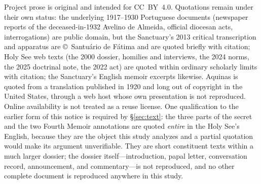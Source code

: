 Project prose is original and intended for CC~BY~4.0. Quotations
remain under their own status: the underlying 1917--1930 Portuguese
documents (newspaper reports of the deceased-in-1932 Avelino de
Almeida, official diocesan acts, interrogations) are public domain,
but the Sanctuary's 2013 critical transcription and apparatus are
\copyright~Santu\'ario de F\'atima and are quoted briefly with
citation; Holy See web texts (the 2000 dossier, homilies and
interviews, the 2024 norms, the 2025 doctrinal note, the 2022 act)
are quoted within ordinary scholarly limits with citation; the
Sanctuary's English memoir excerpts likewise. Aquinas is quoted from
a translation published in 1920 and long out of copyright in the
United States, through a web host whose own presentation is not
reproduced. Online availability is not treated as a reuse license.
One qualification to the earlier form of this notice is required by
\S\ref{sec:text}: the three parts of the secret and the two Fourth
Memoir annotations are quoted \emph{entire} in the Holy See's
English, because they are the object this study analyzes and a
partial quotation would make its argument unverifiable. They are
short constituent texts within a much larger dossier; the dossier
itself---introduction, papal letter, conversation record,
announcement, and commentary---is not reproduced, and no other
complete document is reproduced anywhere in this study.
